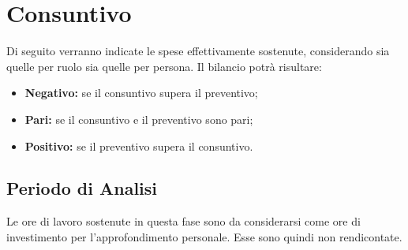 \section{Consuntivo}
Di seguito verranno indicate le spese effettivamente sostenute, considerando sia quelle per ruolo sia quelle per persona. Il bilancio potrà risultare:
\begin{itemize}
	\item \textbf{Negativo:} se il consuntivo supera il preventivo;
	\item \textbf{Pari:} se il consuntivo e il preventivo sono pari;
	\item \textbf{Positivo:} se il preventivo supera il consuntivo.
\end{itemize}

\subsection{Periodo di Analisi}
Le ore di lavoro sostenute in questa fase sono da considerarsi come ore di investimento per l'approfondimento personale. Esse sono quindi non rendicontate.

